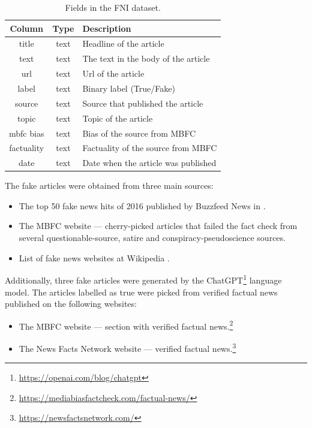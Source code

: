 \begin{table}[H]
    \centering
    \begin{tabular}{c|c|l}
    \textbf{Column} & \cellcolor[HTML]{FFFFFF}\textbf{Type} & \cellcolor[HTML]{FFFFFF}\textbf{Description} \\ \hline
    title      & text & Headline of the article             \\
    text       & text & The text in the body of the article \\
    url        & text & Url of the article                  \\
    label      & text & Binary label (True/Fake)            \\
    source     & text & Source that published the article   \\
    topic      & text & Topic of the article                \\
    mbfc bias  & text & Bias of the source from MBFC        \\
    factuality & text & Factuality of the source from MBFC  \\
    date       & text & Date when the article was published
    \end{tabular}
    \caption{Fields in the FNI dataset.}
    \label{tab:test_dataset}
\end{table}

The fake articles were obtained from three main sources:
\begin{itemize}
    \item The top 50 fake news hits of 2016 published by Buzzfeed News in \cite{buzzfeed:fake}.
    \item The MBFC website --- cherry-picked articles that failed the fact check from several questionable-source, satire and conspiracy-pseudoscience sources.
    \item List of fake news websites at Wikipedia \cite{wiki:fake_list}.
\end{itemize}

Additionally, three fake articles were generated by the ChatGPT\footnote{\url{https://openai.com/blog/chatgpt}} language model. The articles labelled as true were picked from verified factual news published on the following websites:

\begin{itemize}
    \item The MBFC website --- section with verified factual news.\footnote{\url{https://mediabiasfactcheck.com/factual-news/}}
    \item The News Facts Network website --- verified factual news.\footnote{\url{https://newsfactsnetwork.com/}}
\end{itemize}



